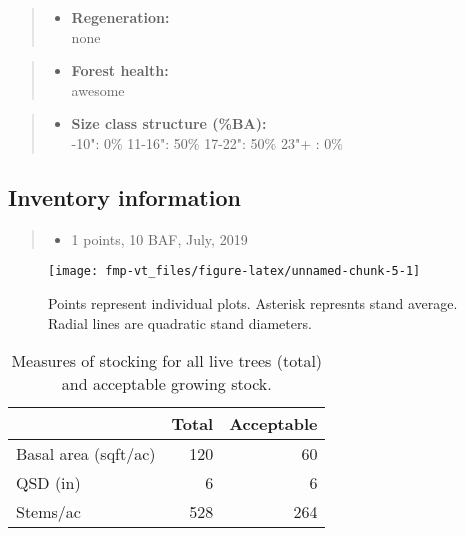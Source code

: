 \documentclass[]{tufte-handout}
\providecommand{\tightlist}{%
  \setlength{\itemsep}{0pt}\setlength{\parskip}{0pt}}
\begin{document}
\begin{quote}
\begin{itemize}
\tightlist
\item
  \textbf{Regeneration:}\\
  \vspace{2pt} none
\end{itemize}
\end{quote}

\begin{quote}
\begin{itemize}
\tightlist
\item
  \textbf{Forest health:}\\
  \vspace{2pt} awesome
\end{itemize}
\end{quote}

\begin{quote}
\begin{itemize}
\tightlist
\item
  \textbf{Size class structure (\%BA):}\\
  \vspace{2pt} -10": 0\% \textbar{} 11-16": 50\% \textbar{}
  17-22": 50\% \textbar{} 23"+ : 0\%
\end{itemize}
\end{quote}

\subsection{Inventory information}\label{inventory-information}

\begin{quote}
\begin{itemize}
\tightlist
\item
  1 points, 10 BAF, July, 2019
\end{itemize}
\end{quote}

\begin{figure}
\texttt{[image: fmp-vt\_files/figure-latex/unnamed-chunk-5-1]} \caption[Points represent individual plots]{Points represent individual plots. Asterisk represnts stand average. Radial lines are quadratic stand diameters.}\label{fig:unnamed-chunk-5}
\end{figure}

\begin{table}

\caption{\label{tab:unnamed-chunk-6}Measures of stocking for all live trees (total) and acceptable growing stock.}
\centering
\begin{tabular}[t]{lrr}
\toprule
  & Total & Acceptable\\
\midrule
Basal area (sqft/ac) & 120 & 60\\
QSD (in) & 6 & 6\\
Stems/ac & 528 & 264\\
\bottomrule
\end{tabular}
\end{table}
\end{document}
